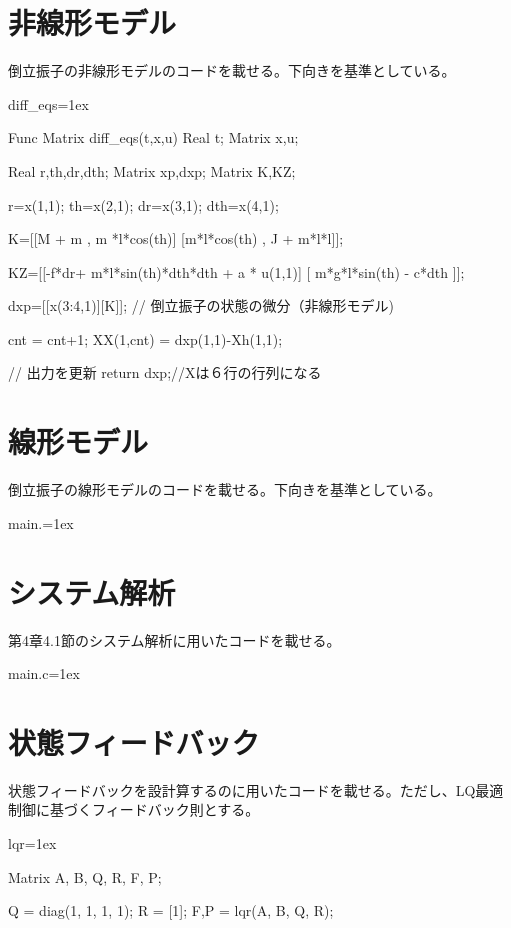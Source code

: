 \section{非線形モデル}
	倒立振子の非線形モデルのコードを載せる。下向きを基準としている。
	\begin{itembox}[l]{diff\_eqs}\baselineskip=1ex
		\begin{verbatimtab}[4]
Func Matrix diff_eqs(t,x,u)
Real t;
Matrix x,u;
{
	Real r,th,dr,dth;
	Matrix xp,dxp;
	Matrix K,KZ;

	r=x(1,1);
	th=x(2,1);
	dr=x(3,1);
	dth=x(4,1);

	K=[[M + m , m *l*cos(th)]
	   [m*l*cos(th) , J + m*l*l]];

	KZ=[[-f*dr+ m*l*sin(th)*dth*dth + a * u(1,1)]
		[ m*g*l*sin(th) - c*dth ]];
	
	dxp=[[x(3:4,1)][K\KZ]]; // 倒立振子の状態の微分（非線形モデル)

	cnt = cnt+1;
	XX(1,cnt) = dxp(1,1)-Xh(1,1);
	
	// 出力を更新
	return dxp;//Xは６行の行列になる
}
		\end{verbatimtab}
	\end{itembox}
\section{線形モデル}
	倒立振子の線形モデルのコードを載せる。下向きを基準としている。
	\begin{itembox}[l]{main.}\baselineskip=1ex
		\begin{verbatimtab}[4]

		\end{verbatimtab}
	\end{itembox}
\section{システム解析}
	第4章4.1節のシステム解析に用いたコードを載せる。
	\begin{itembox}[l]{main.c}\baselineskip=1ex
		\begin{verbatimtab}[4]

		\end{verbatimtab}
	\end{itembox}
\section{状態フィードバック}
	状態フィードバックを設計算するのに用いたコードを載せる。ただし、LQ最適制御に基づくフィードバック則とする。
	\begin{itembox}[l]{lqr}\baselineskip=1ex
		\begin{verbatimtab}[4]
Matrix A, B, Q, R, F, P;

Q = diag(1, 1, 1, 1);
R = [1];
{F,P} = lqr(A, B, Q, R);
		\end{verbatimtab}
	\end{itembox}
